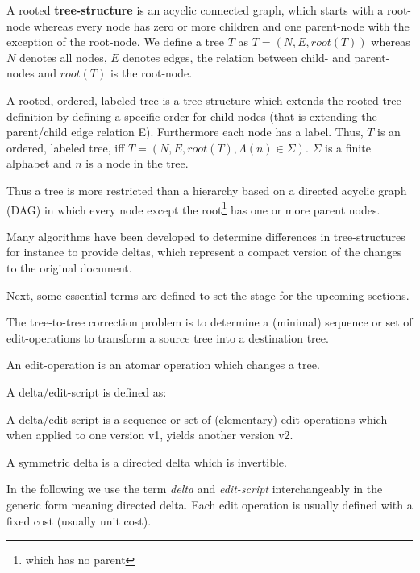 \begin{mydef}
A rooted \textbf{tree-structure} is an acyclic connected graph, which starts with a root-node whereas every node has zero or more children and one parent-node with the exception of the root-node. We define a tree $T$ as $T = (N, E, root(T))$ whereas $N$ denotes all nodes, $E$ denotes edges, the relation between child- and parent-nodes and $root(T)$ is the root-node.
\end{mydef}

\begin{mydef}
A rooted, ordered, labeled tree is a tree-structure which extends the rooted tree-definition by defining a specific order for child nodes (that is extending the parent/child edge relation E). Furthermore each node has a label. Thus, $T$ is an ordered, labeled tree, iff $T = (N, E, root(T), \Lambda(n) \in \Sigma)$. $\Sigma$ is a finite alphabet and $n$ is a node in the tree.
\end{mydef}

Thus a tree is more restricted than a hierarchy based on a directed acyclic graph (DAG) in which every node except the root\footnote{which has no parent} has one or more parent nodes.

Many algorithms have been developed to determine differences in tree-structures for instance to provide deltas, which represent a compact version of the changes to the original document.

Next, some essential terms are defined to set the stage for the upcoming sections.

The tree-to-tree correction problem is to determine a (minimal) sequence or set of edit-operations to transform a source tree into a destination tree. 

\begin{mydef}
An edit-operation is an atomar operation which changes a tree.
\end{mydef}

A delta/edit-script is defined as:

\begin{mydef}
A delta/edit-script is a sequence or set of (elementary) edit-operations which when applied to one version v1, yields another version v2.
\end{mydef}

\begin{mydef}
A symmetric delta is a directed delta which is invertible.
\end{mydef}

In the following we use the term \emph{delta} and \emph{edit-script} interchangeably in the generic form meaning directed delta. Each edit operation is usually defined with a fixed cost (usually unit cost).

